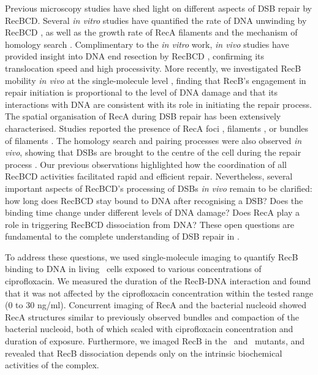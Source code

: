 Previous microscopy studies have shed light on different aspects of DSB repair by RecBCD. Several \emph{in vitro} studies have quantified the rate of DNA unwinding by RecBCD \cite{Spies2003,Liu2013}, as well as the growth rate of RecA filaments \cite{Joo2006,Galletto2006,Handa2009} and the mechanism of homology search \cite{Forget2012,Ragunathan2012}. Complimentary to the \emph{in vitro} work, \emph{in vivo} studies have provided insight into DNA end resection by RecBCD \cite{Wiktor2018}, confirming its translocation speed and high processivity. More recently, we investigated RecB mobility \emph{in vivo} at the single-molecule level \cite{Lepore2023}, finding that RecB's engagement in repair initiation is proportional to the level of DNA damage and that its interactions with DNA are consistent with its role in initiating the repair process. The spatial organisation of RecA during DSB repair has been extensively characterised. Studies reported the presence of RecA foci \cite{Renzette2005,Renzette2007,Centore2007,Amarh2018}, filaments \cite{Kidane2005}, or bundles of filaments \cite{Lesterlin2013,Ghodke2019}. The homology search and pairing processes were also observed \emph{in vivo}, showing that DSBs are brought to the centre of the cell during the repair process \cite{Badrinarayanan2015,Wiktor2021}. Our previous observations \cite{Lepore2023} highlighted how the coordination of all RecBCD activities facilitated rapid and efficient repair. Nevertheless, several important aspects of RecBCD's processing of DSBs \emph{in vivo} remain to be clarified: how long does RecBCD stay bound to DNA after recognising a DSB? Does the binding time change under different levels of DNA damage? Does RecA play a role in triggering RecBCD dissociation from DNA? These open questions are fundamental to the complete understanding of DSB repair in \ecoli.

To address these questions, we used single-molecule imaging to quantify RecB binding to DNA in living \ecoli\ cells exposed to various concentrations of ciprofloxacin. We measured the duration of the RecB-DNA interaction and found that it was not affected by the ciprofloxacin concentration within the tested range (0 to 30 ng/ml). Concurrent imaging of RecA and the bacterial nucleoid showed RecA structures similar to previously observed bundles and compaction of the bacterial nucleoid, both of which scaled with ciprofloxacin concentration and duration of exposure. Furthermore, we imaged RecB in the \dreca\ and \geneteneighty\ mutants, and revealed that RecB dissociation depends only on the intrinsic biochemical activities of the complex.
